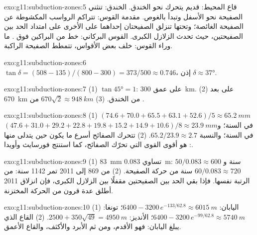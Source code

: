 \begin{solution}{exo:g11:subduction-zones:5}
قاع المحيط:  قديم يتحرك نحو الخندق. الخندق: تنثني الصفيحة
نحو الأسفل وتبدأ بالغوص. مقدمة القوس: تتراكم الرواسب المكشوطة عن الصفيحة الغائصة؛
وتحتها تنزلق الصفيحتان إحداهما على الأخرى على امتداد الحد بين الصفيحتين،
حيث تحدث الزلازل الكبرى. القوس البركاني: خط من البراكين فوق
. ما وراء القوس: خلف بعض الأقواس، تتمطط الصفيحة الراكبة.
\end{solution}

\begin{solution}{exo:g11:subduction-zones:6}
$\tan\delta = (508 - 135)/(800 - 300) = 373/500 \approx 0.746$، إذن
$\delta \approx \ang{37}$.
\end{solution}

\begin{solution}{exo:g11:subduction-zones:7}
(1) $\tan\ang{45} = 1$: على عمق \qty{300}{km}. (2) على بعد \qty{670}{km} من
الخندق. (3) $670\sqrt{2} \approx \qty{948}{km}$ من .
\end{solution}

\begin{solution}{exo:g11:subduction-zones:8}
(1) $(74.6 + 70.0 + 65.5 + 63.1 + 52.6)/5 \approx \qty{65.2}{mm}$ في السنة؛
و$(47.6 + 31.0 + 29.2 + 22.8 + 19.8 + 15.2 + 14.9 + 10.6)/8 \approx
\qty{23.9}{mm}$ في السنة؛ والنسبة $65.2/23.9 \approx 2.7$. (2) تتحرك الصفائح
أسرع ما يكون حين يتدلى منها :  هو
أقوى القوى التي تحرّك الصفائح، كما استنتج فورسايث وأويدا.
\end{solution}

\begin{solution}{exo:g11:subduction-zones:9}
(1) \qty{83}{mm} تساوي \qty{0.083}{m}: $50/0.083 \approx 600$ سنة
و$60/0.083 \approx 720$ سنة من حركة الصفيحة. (2) من 869 إلى 2011 تمر 1142
سنة: من الرتبة نفسها. فإذا بقي الحد بين الصفيحتين مقفلًا بين الزلازل
الكبرى، فإن انزلاق 2011 أطلق عدة قرون من الحركة المختزنة.
\end{solution}

\begin{solution}{exo:g11:subduction-zones:10}
(1) اليابان: $6400 - 3200\,e^{-133/62.8} \approx \qty{6015}{m}$؛ تونغا:
$6400 - 3200\,e^{-99/62.8} \approx \qty{5740}{m}$؛ الأنديز:
$2500 + 350\sqrt{49} = \qty{4950}{m}$. (2) القاع الذي يبلغ اليابان: فهو
الأقدم، ومن ثم  الأبرد والأكثف، والقاع الأعمق.
\end{solution}

